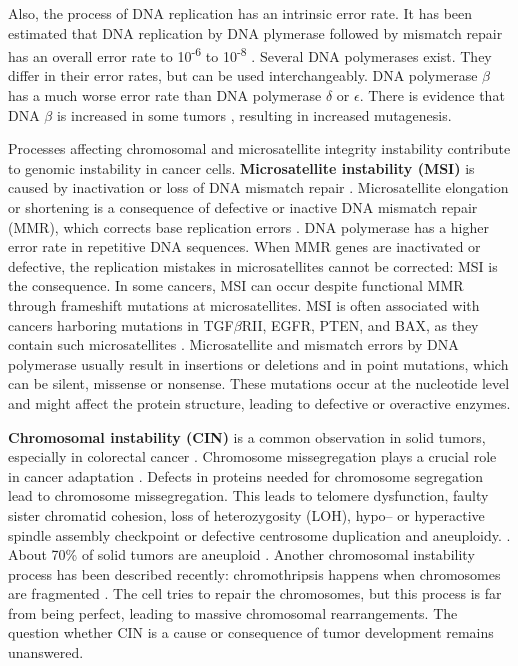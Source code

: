     Also, the process of DNA replication has an intrinsic error rate. It has
    been estimated that DNA replication by DNA plymerase followed by mismatch
    repair has an overall error rate to 10\textsuperscript{-6} to
    10\textsuperscript{-8} {\cite{multiple_mutations}}. Several DNA polymerases
    exist. They differ in their error rates, but can be used interchangeably.
    DNA polymerase $\beta$ has a much worse error rate than DNA polymerase
    $\delta$ or $\epsilon$. There is evidence that DNA $\beta$ is increased in
    some tumors {\cite{dna_pol}}, resulting in increased mutagenesis.

    Processes affecting chromosomal and microsatellite integrity instability
    contribute to genomic instability in cancer cells. \textbf{Microsatellite
    instability (MSI)} is caused by inactivation or loss of DNA mismatch repair
    {\cite{msi}}.
    Microsatellite elongation or shortening is a consequence of defective or
    inactive DNA mismatch repair (MMR), which corrects base replication errors
    {\cite{cin_crc}}. DNA polymerase has a higher
    error rate in repetitive DNA sequences. When MMR genes are inactivated or
    defective, the replication mistakes in microsatellites cannot be corrected:
    MSI is the consequence. In some cancers, MSI can occur despite functional
    MMR through frameshift mutations at microsatellites. MSI is often associated
    with cancers harboring mutations in TGF$\beta$RII, EGFR, PTEN, and BAX, as
    they contain such microsatellites {\cite{micro}}. Microsatellite and
    mismatch errors by DNA polymerase usually result in insertions or deletions
    and in point mutations, which can be silent, missense or nonsense. These
    mutations occur at the nucleotide level and  might affect the protein
    structure, leading to defective or overactive  enzymes.

    \textbf{Chromosomal instability (CIN)} is a common observation in solid
    tumors, especially in colorectal cancer {\cite{cin_crc}}. Chromosome
    missegregation plays a crucial role in cancer adaptation
    {\cite{chromosome_missegregation}}. Defects in proteins needed for
    chromosome segregation lead to chromosome missegregation. This leads to
    telomere dysfunction, faulty sister chromatid cohesion, loss of
    heterozygosity (LOH), hypo-- or hyperactive spindle assembly checkpoint or
    defective centrosome duplication and aneuploidy. {\cite{cin_crc}}. About
    70\% of solid tumors are aneuploid {\cite{aneuploidy}}. Another chromosomal
    instability process has been described recently: chromothripsis happens when
    chromosomes are fragmented {\cite{chromothripsis_1}}
    {\cite{chromothripsis_2}} {\cite{chromothripsis_2}}. The cell tries to
    repair the chromosomes, but this process is far from being perfect, leading
    to massive chromosomal rearrangements. The question whether CIN is a cause
    or consequence of tumor development remains unanswered.

